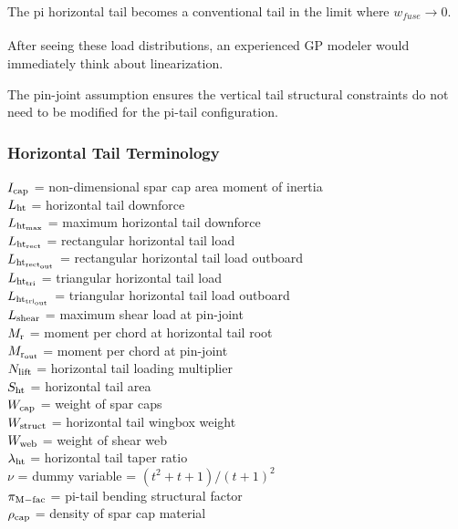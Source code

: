 The pi horizontal tail becomes a conventional tail in the limit where $w_{fuse} \xrightarrow[]{} 0$. 


After seeing these load distributions, an experienced \gls{GP} modeler would immediately think about linearization. 



The pin-joint assumption ensures the vertical tail structural constraints do not 
need to be modified for the pi-tail configuration. 



\subsubsection{Horizontal Tail Terminology}
\begin{tabbing}
$I_{\rm{cap}}$ = non-dimensional spar cap area moment of inertia \\
$L_{\rm{ht}}$ = horizontal tail downforce \\
$L_{\rm{ht}_{\rm{max}}}$ = maximum horizontal tail downforce \\
$L_{\rm{ht}_{rect}}$ = rectangular horizontal tail load \\
$L_{\rm{ht}_{\rm{rect}_{\rm{out}}}}$ = rectangular horizontal tail load outboard\\
$L_{\rm{ht}_{\rm{tri}}}$ = triangular horizontal tail load \\
$L_{\rm{ht}_{tri_{\rm{out}}}}$ = triangular horizontal tail load outboard\\
$L_{\rm{shear}}$ = maximum shear load at pin-joint\\
$M_{\rm{r}}$ = moment per chord at horizontal tail root \\
$M_{\rm{r}_{\rm{out}}}$ = moment per chord at pin-joint\\
$N_{\rm{lift}}$ = horizontal tail loading multiplier \\
$S_{\rm{ht}}$ = horizontal tail area \\
$W_{\rm{cap}}$ = weight of spar caps \\
$W_{\rm{struct}}$ = horizontal tail wingbox weight \\
$W_{\rm{web}}$ = weight of shear web \\
$\lambda_{\rm{ht}}$ = horizontal tail taper ratio \\
$\nu$ = dummy variable = $(t^2 + t + 1)/(t+1)^2$ \\
$\pi_{\rm{M-fac}}$ = pi-tail bending structural factor \\
$\rho_{\rm{cap}}$ = density of spar cap material \\

\end{tabbing}
